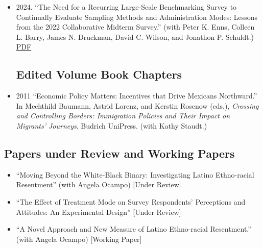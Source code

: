 \documentclass[11pt,letterpaper]{moderncv}
\newcommand{\faFilePdf}[1][]{PDF}
\begin{document}
\begin{itemize}
\subsection{Other Academic Publications}

\item 2024. ``The Need for a Recurring Large-Scale Benchmarking Survey to Continually Evaluate Sampling Methods and Administration Modes: Lessons from the 2022 Collaborative Midterm Survey.'' (with Peter K. Enns, Colleen L. Barry, James N. Druckman, David C. Wilson, and Jonathon P. Schuldt.) \href{https://arxiv.org/abs/2407.06090}{\textcolor{myblue}{\faFilePdf[regular]}}\\



\subsection{Edited Volume Book Chapters}

\item 2011 ``Economic Policy Matters: Incentives that Drive Mexicans Northward.'' In Mechthild Baumann, Astrid Lorenz, and Kerstin Rosenow (eds.), \textit{Crossing and Controlling Borders: Immigration Policies and Their Impact on Migrants' Journeys}. Budrich UniPress. (with Kathy Staudt.) \\
\end{itemize} 

\subsection{Papers under Review and Working Papers}
\begin{itemize}

\setlength{\itemsep}{3.5pt}



\item ``Moving Beyond the White-Black Binary:  Investigating Latino Ethno-racial Resentment'' (with Angela Ocampo) [Under Review]

\item ``The Effect of Treatment Mode on Survey Respondents' Perceptions and Attitudes: An Experimental Design'' [Under Review]


\item ``A Novel Approach and New Measure of Latino Ethno-racial Resentment.'' (with Angela Ocampo)  [Working Paper]
%
%
%
%
%
\end{itemize}
%
\end{document}
